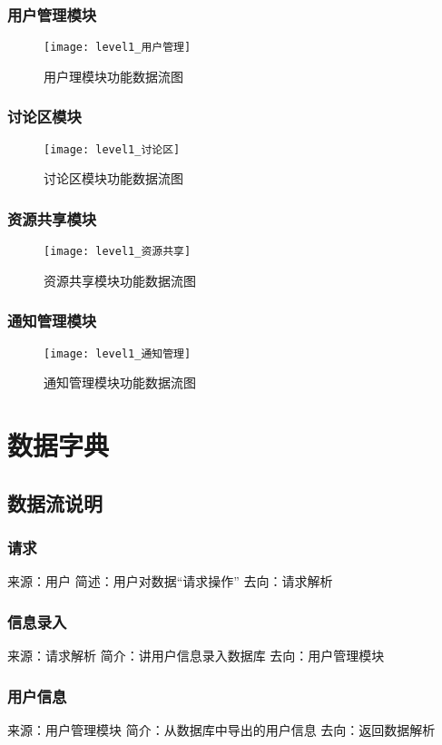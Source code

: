 \subsubsection{用户管理模块}
\begin{figure}[H]
\centering
\texttt{[image: level1\_用户管理]}
\caption{用户理模块功能数据流图}
\end{figure}
\subsubsection{讨论区模块}
\begin{figure}[H]
\centering
\texttt{[image: level1\_讨论区]}
\caption{讨论区模块功能数据流图}
\end{figure}
\subsubsection{资源共享模块}
\begin{figure}[H]
\centering
\texttt{[image: level1\_资源共享]}
\caption{资源共享模块功能数据流图}
\end{figure}
\subsubsection{通知管理模块}
\begin{figure}[H]
\centering
\texttt{[image: level1\_通知管理]}
\caption{通知管理模块功能数据流图}
\end{figure}

\section{数据字典}
\subsection{数据流说明}
\subsubsection{请求}
来源：用户
简述：用户对数据“请求操作”
去向：请求解析

\subsubsection{信息录入}
来源：请求解析
简介：讲用户信息录入数据库
去向：用户管理模块

\subsubsection{用户信息}
来源：用户管理模块
简介：从数据库中导出的用户信息
去向：返回数据解析

